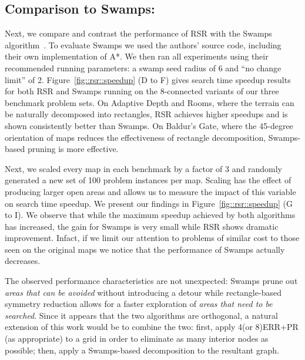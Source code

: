 \subsection{Comparison to Swamps:}
Next, we compare and contrast the performance of RSR with the Swamps
algorithm~\citep{pochter10}.  To evaluate Swamps we used the authors' source
code, including their own implementation of A*.  We then ran all experiments
using their recommended running parameters: a swamp seed radius of 6 and ``no
change limit'' of 2.
Figure~\ref{fig::rsr::speedup} (D to F) gives search time speedup results for both RSR
and Swamps running on the 8-connected variants of our three benchmark problem
sets. 
On Adaptive Depth and Rooms, where the terrain can be naturally decomposed into
rectangles, RSR achieves higher speedups and is shown consistently better than Swamps. 
On Baldur's Gate, where the 45-degree orientation of maps reduces the effectiveness
of rectangle decomposition, Swamps-based pruning is more effective. 
\par
Next, we scaled every map in each benchmark by a factor of 3 and randomly
generated a new set of 100 problem instances per map.  Scaling has the effect of
producing larger open areas and allows us to measure the impact of this variable
on search time speedup.  We present our findings in  Figure~\ref{fig::rsr::speedup} (G
to I).  We observe that while the maximum speedup achieved by both algorithms
has increased, the gain for Swamps is very small while RSR shows dramatic
improvement.  Infact, if we limit our attention to problems of similar cost to
those seen on the original maps we notice that the performance of Swamps
actually decreases.
\par
The observed performance characteristics are not unexpected: Swamps prune out
\textit{areas that can be avoided} without introducing a detour while rectangle-based
symmetry reduction allows for a faster exploration of \textit{areas that need to be
searched}.  Since it appears that the two algorithms are orthogonal, a natural
extension of this work would be to combine the two: first, apply 4(or 8)ERR+PR
(as appropriate) to a grid in order to eliminate as many interior nodes as
possible; then, apply a Swamps-based decomposition to the resultant graph.



